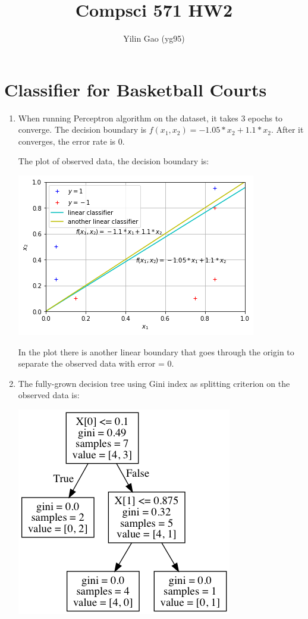 \documentclass[paper=letter, fontsize=12pt]{article}
\title{Compsci 571 HW2}
\author{Yilin Gao (yg95)}
\begin{document}
\maketitle
\section{Classifier for Basketball Courts}

\begin{enumerate}[label=(\alph*)]
	\item When running Perceptron algorithm on the dataset, it takes 3 epochs to converge. The decision boundary is $f(x_1, x_2) = -1.05 * x_2 + 1.1 * x_2$. After it converges, the error rate is 0.
	
	The plot of observed data, the decision boundary is:
	
	\includegraphics[scale=0.6]{q1a.png}
	
	In the plot there is another linear boundary that goes through the origin to separate the observed data with error = 0.
	
	\item The fully-grown decision tree using Gini index as splitting criterion on the observed data is:
	
	\includegraphics[scale=0.6]{q1b_tree.png}
	

\end{enumerate}
\end{document}
